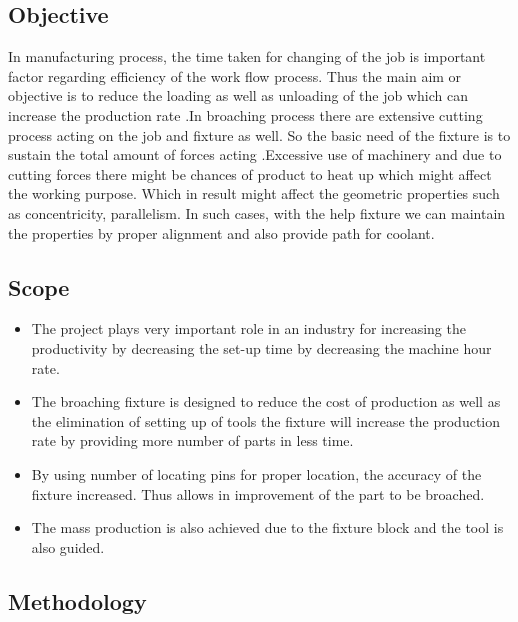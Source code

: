 \documentclass[16pt,a4paper]{article}
\begin{document}
\subsection{Objective}
In manufacturing process, the time taken for changing of the job is important factor regarding efficiency of the work flow process. Thus the main aim or objective is to reduce the loading as well as unloading of the job which can increase the production rate .In broaching process there are extensive cutting process acting on the job and fixture as well. So the basic need of the fixture is to sustain the total amount of forces acting .Excessive use of machinery and due to cutting forces there might be chances of product to heat up which might affect the working purpose. Which in result might affect the geometric properties such as concentricity, parallelism. In such cases, with the help fixture we can maintain the properties by proper alignment and also provide path for coolant.

\subsection{Scope}
\begin{itemize}
\item The project plays very important role in an industry for increasing the productivity by decreasing the set-up time by decreasing the machine hour rate.
\item The broaching fixture is designed to reduce the cost of production as well as the elimination of setting up of tools the fixture will increase the production rate by providing more number of parts in less time.
\item By using number of locating pins for proper location, the accuracy of the fixture increased. Thus allows in improvement of the part to be broached.
\item The mass production is also achieved due to the fixture block and the tool is also guided.
\end{itemize}

\subsection{Methodology}
\end{document}
